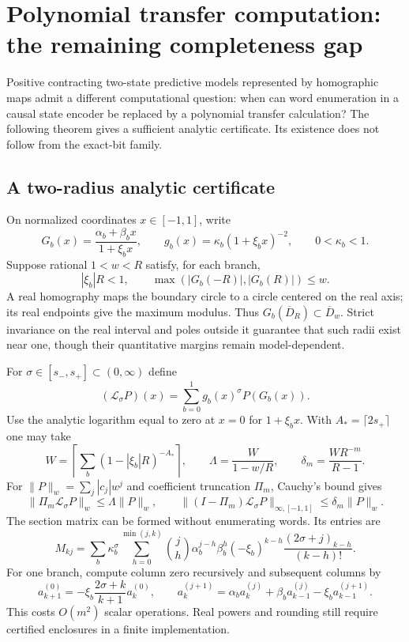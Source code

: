 \section{Polynomial transfer computation: the remaining completeness gap}\label{III:U:sec:oracle}
Positive contracting two-state predictive models represented by homographic
maps admit a different computational question: when can word enumeration in
a causal state encoder be replaced by a polynomial transfer calculation?
The following theorem gives a sufficient analytic certificate. Its existence
does not follow from the exact-bit family.

\subsection{A two-radius analytic certificate}
On normalized coordinates $x\in[-1,1]$, write
\[
 G_b(x)=\frac{\alpha_b+\beta_bx}{1+\xi_bx},\qquad
 g_b(x)=\kappa_b(1+\xi_bx)^{-2},\qquad 0<\kappa_b<1.
\]
Suppose rational $1<w<R$ satisfy, for each branch,
\[
 |\xi_b|R<1,\qquad \max(|G_b(-R)|,|G_b(R)|)\le w.
\]
A real homography maps the boundary circle to a circle centered on the
real axis; its real endpoints give the maximum modulus. Thus
$G_b(\overline D_R)\subset\overline D_w$. Strict invariance on the
real interval and poles outside it guarantee that such radii exist near
one, though their quantitative margins remain model-dependent.

For $\sigma\in[s_-,s_+]\subset(0,\infty)$ define
\[
 (\mathcal L_\sigma P)(x)=\sum_{b=0}^1g_b(x)^\sigma P(G_b(x)).
\]
Use the analytic logarithm equal to zero at $x=0$ for $1+\xi_bx$.
With $A_* =\lceil2s_+\rceil$ one may take
\[
 W=\left\lceil\sum_b(1-|\xi_b|R)^{-A_*}\right\rceil,
 \qquad\Lambda=\frac W{1-w/R},\qquad
 \delta_m=\frac{WR^{-m}}{R-1}.
\]
For $\|P\|_w=\sum_j|c_j|w^j$ and coefficient truncation $\Pi_m$,
Cauchy's bound gives
\[
 \|\Pi_m\mathcal L_\sigma P\|_w\le\Lambda\|P\|_w,
 \qquad\|(I-\Pi_m)\mathcal L_\sigma P\|_{\infty,[-1,1]}
                                      \le\delta_m\|P\|_w.
\]
The section matrix can be formed without enumerating words. Its entries are
\[
 M_{kj}=\sum_b\kappa_b^\sigma
 \sum_{h=0}^{\min(j,k)}\binom jh\alpha_b^{j-h}\beta_b^h
 (-\xi_b)^{k-h}\frac{(2\sigma+j)_{k-h}}{(k-h)!}.
\]
For one branch, compute column zero recursively and subsequent columns by
\[
 a_{k+1}^{(0)}=-\xi_b\frac{2\sigma+k}{k+1}a_k^{(0)},\qquad
 a_k^{(j+1)}=\alpha_ba_k^{(j)}+\beta_ba_{k-1}^{(j)}
                                      -\xi_ba_{k-1}^{(j+1)}.
\]
This costs $O(m^2)$ scalar operations. Real powers and rounding still
require certified enclosures in a finite implementation.


